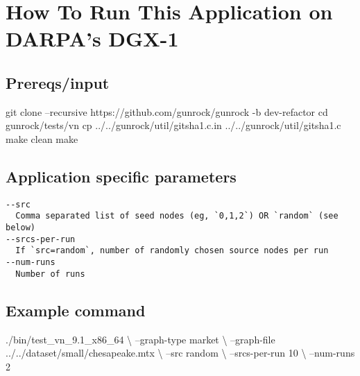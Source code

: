 \documentclass[10pt,oneside]{memoir}
\newenvironment{Shaded}{}{}
\newcommand{\BuiltInTok}[1]{#1}
\newcommand{\ExtensionTok}[1]{#1}
\newcommand{\FunctionTok}[1]{\textcolor[rgb]{0.02,0.16,0.49}{#1}}
\newcommand{\NormalTok}[1]{#1}
\begin{document}
\hypertarget{how-to-run-this-application-on-darpas-dgx-1-9}{%
\section{How To Run This Application on DARPA's
DGX-1}\label{how-to-run-this-application-on-darpas-dgx-1-9}}

\hypertarget{prereqsinput-9}{%
\subsection{Prereqs/input}\label{prereqsinput-9}}

\begin{Shaded}
\begin{Highlighting}[]
\FunctionTok{git}\NormalTok{ clone --recursive https://github.com/gunrock/gunrock -b dev-refactor}
\BuiltInTok{cd}\NormalTok{ gunrock/tests/vn}
\FunctionTok{cp}\NormalTok{ ../../gunrock/util/gitsha1.c.in ../../gunrock/util/gitsha1.c}
\FunctionTok{make}\NormalTok{ clean}
\FunctionTok{make}
\end{Highlighting}
\end{Shaded}

\hypertarget{application-specific-parameters-4}{%
\subsection{Application specific
parameters}\label{application-specific-parameters-4}}

\begin{verbatim}
--src
  Comma separated list of seed nodes (eg, `0,1,2`) OR `random` (see below)
--srcs-per-run
  If `src=random`, number of randomly chosen source nodes per run
--num-runs
  Number of runs
\end{verbatim}

\hypertarget{example-command-6}{%
\subsection{Example command}\label{example-command-6}}

\begin{Shaded}
\begin{Highlighting}[]
\ExtensionTok{./bin/test_vn_9.1_x86_64}\NormalTok{ \textbackslash{}}
\NormalTok{    --graph-type market \textbackslash{}}
\NormalTok{    --graph-file ../../dataset/small/chesapeake.mtx \textbackslash{}}
\NormalTok{    --src random \textbackslash{}}
\NormalTok{    --srcs-per-run 10 \textbackslash{}}
\NormalTok{    --num-runs 2}
\end{Highlighting}
\end{Shaded}
\end{document}

